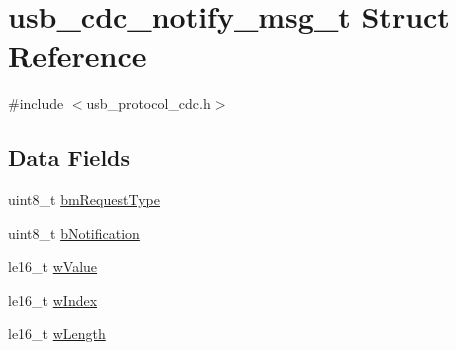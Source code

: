 \hypertarget{structusb__cdc__notify__msg__t}{
\section{usb\-\_\-cdc\-\_\-notify\-\_\-msg\-\_\-t \-Struct \-Reference}
\label{structusb__cdc__notify__msg__t}
}


{\ttfamily \#include $<$usb\-\_\-protocol\-\_\-cdc.\-h$>$}

\subsection*{\-Data \-Fields}
\begin{DoxyCompactItemize}
\item 
uint8\-\_\-t \hyperlink{structusb__cdc__notify__msg__t_a302292c741d73ddb118c034484b12e58}{bm\-Request\-Type}
\item 
uint8\-\_\-t \hyperlink{structusb__cdc__notify__msg__t_a858771e881f30423359fd2500d8becd0}{b\-Notification}
\item 
le16\-\_\-t \hyperlink{structusb__cdc__notify__msg__t_a6e2257375ef68c47f07c8dc504f75268}{w\-Value}
\item 
le16\-\_\-t \hyperlink{structusb__cdc__notify__msg__t_ad4d5d5479a4600ae64f81812ba7cacc9}{w\-Index}
\item 
le16\-\_\-t \hyperlink{structusb__cdc__notify__msg__t_aee9ecbc7f624ac837f027332b1580b93}{w\-Length}
\end{DoxyCompactItemize}


